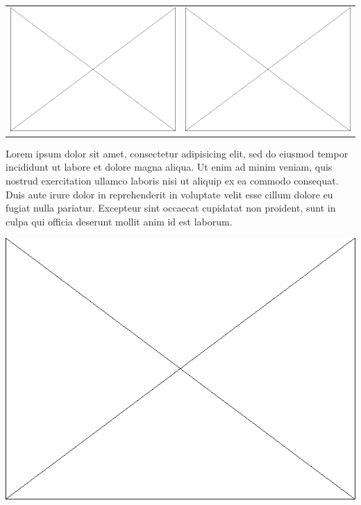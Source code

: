 \documentclass[portrait,final,a0paper,fontscale=0.177]{baposter}
\begin{document}
\begin{poster}
{  \begin{center}
  \begin{tabular}{cc}
  \includegraphics[width=0.45\linewidth]{platzhalter_horizontal.eps} & 
   \includegraphics[width=0.45\linewidth]{platzhalter_horizontal.eps} \\
   \end{tabular}
  \end{center}
  
  Lorem ipsum dolor sit amet, consectetur adipisicing elit, sed do eiusmod tempor incididunt ut labore et dolore magna aliqua. Ut enim ad minim veniam, quis nostrud exercitation ullamco laboris nisi ut aliquip ex ea commodo consequat. Duis aute irure dolor in reprehenderit in voluptate velit esse cillum dolore eu fugiat nulla pariatur. Excepteur sint occaecat cupidatat non proident, sunt in culpa qui officia deserunt mollit anim id est laborum.
  
  \begin{center}
   \includegraphics[width=0.75\linewidth]{platzhalter_horizontal.eps}
  \end{center}
    
}
\end{poster}
\end{document}

